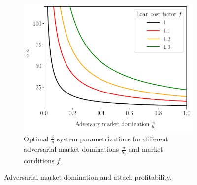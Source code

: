 

\begin{figure}[htb]
  \centering
  \hfill
  \begin{subfigure}{0.5\textwidth}
    \includegraphics[width=\textwidth]{./plots/multiplef_plotu.pdf}
    \caption{Optimal $\frac{\phi}{q}$ system parametrizations
             for different adversarial market dominations $\frac{u}{b_0}$
             and market conditions $f$.}
    \label{fig:compare-f-plotu}
  \end{subfigure}
  \caption{Adversarial market domination and attack profitability.}
  \label{fig:plotu}
\end{figure}

